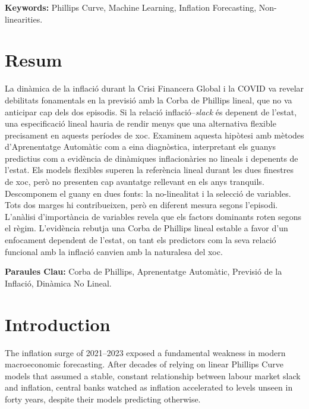 \documentclass[12pt,a4paper]{article}
\begin{document}
\noindent\textbf{Keywords:} Phillips Curve, Machine Learning, Inflation Forecasting, Non-linearities.

\section*{Resum}
La dinàmica de la inflació durant la Crisi Financera Global i la COVID va revelar debilitats fonamentals en la previsió amb la Corba de Phillips lineal, que no va anticipar cap dels dos episodis. Si la relació inflació–\textit{slack} és depenent de l'estat, una especificació lineal hauria de rendir menys que una alternativa flexible precisament en aquests períodes de xoc. Examinem aquesta hipòtesi amb mètodes d'Aprenentatge Automàtic com a eina diagnòstica, interpretant els guanys predictius com a evidència de dinàmiques inflacionàries no lineals i depenents de l'estat. Els models flexibles superen la referència lineal durant les dues finestres de xoc, però no presenten cap avantatge rellevant en els anys tranquils. Descomponem el guany en dues fonts: la no-linealitat i la selecció de variables. Tots dos marges hi contribueixen, però en diferent mesura segons l'episodi. L'anàlisi d'importància de variables revela que els factors dominants roten segons el règim. L'evidència rebutja una Corba de Phillips lineal estable a favor d'un enfocament dependent de l'estat, on tant els predictors com la seva relació funcional amb la inflació canvien amb la naturalesa del xoc.

\noindent\textbf{Paraules Clau:} Corba de Phillips, Aprenentatge Automàtic, Previsió de la Inflació, Dinàmica No Lineal.


\newpage
\pagestyle{empty}
\tableofcontents

\newpage
{}
\pagestyle{plain}
\setcounter{page}{1}
\section{Introduction}
\label{sec:introduction}

The inflation surge of 2021--2023 exposed a fundamental weakness in modern macroeconomic forecasting. After decades of relying on linear Phillips Curve models that assumed a stable, constant relationship between labour market slack and inflation, central banks watched as inflation accelerated to levels unseen in forty years, despite their models predicting otherwise. 
\end{document}
